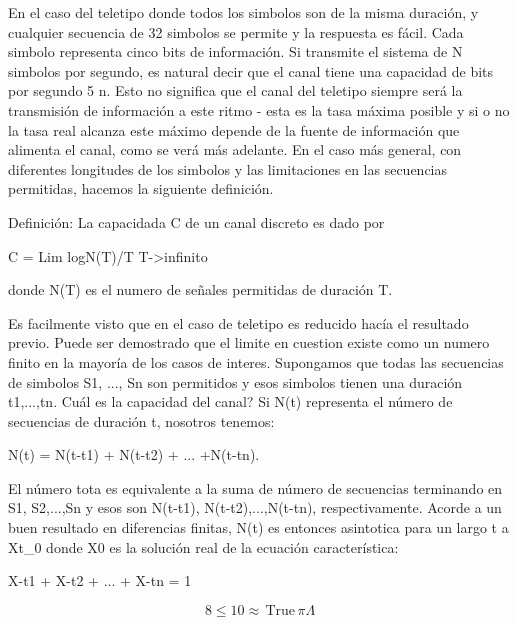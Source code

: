 En el caso del teletipo donde todos los simbolos son de la misma
duración, y cualquier secuencia de 32 simbolos se permite y la
respuesta es fácil. Cada simbolo representa cinco bits de información.
Si transmite el sistema de N simbolos por segundo, es natural decir
que el canal tiene una capacidad de bits por segundo 5 n. Esto no
significa que el canal del teletipo siempre será la transmisión de
información a este ritmo - esta es la tasa máxima posible y si o no la
tasa real alcanza este máximo depende de la fuente de información que
alimenta el canal, como se verá más adelante. En el caso más general,
con diferentes longitudes de los simbolos y las limitaciones en las
secuencias permitidas, hacemos la siguiente definición.

Definición: La capacidada C de un canal discreto es dado por

            C = Lim         logN(T)/T
                T->infinito

donde N(T) es el numero de señales permitidas de duración T.

Es facilmente visto que en el caso de teletipo es reducido hacía el
resultado previo. Puede ser demostrado que el limite en cuestion
existe como un numero finito en la mayoría de los casos de interes.
Supongamos que todas las secuencias de simbolos S1, ..., Sn son
permitidos y esos simbolos tienen una duración t1,...,tn. Cuál es la
capacidad del canal? Si N(t) representa el número de secuencias de
duración t, nosotros tenemos:

         N(t) = N(t-t1) + N(t-t2) + ... +N(t-tn).

El número tota es equivalente a la suma de número de secuencias
terminando en S1, S2,...,Sn y esos son N(t-t1), N(t-t2),...,N(t-tn),
respectivamente. Acorde a un buen resultado en diferencias finitas,
N(t) es entonces asintotica para un largo t a Xt_0 donde X0 es la
solución real de la ecuación característica:

         X-t1 + X-t2 + ... + X-tn = 1

\begin{equation}
8 \leq 10 \approx \, \text{True} \, \pi \Lambda
\end{equation}
